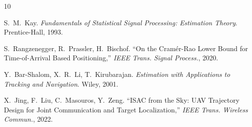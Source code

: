 \begin{thebibliography}{10}

S.~M.~Kay.
\textit{Fundamentals of Statistical Signal Processing: Estimation Theory}.
Prentice-Hall, 1993.

S.~Rangzenegger, R.~Prassler, H.~Bischof.
``On the Cram\'{e}r-Rao Lower Bound for Time-of-Arrival Based Positioning,''
\textit{IEEE Trans. Signal Process.}, 2020.

Y.~Bar-Shalom, X.~R.~Li, T.~Kirubarajan.
\textit{Estimation with Applications to Tracking and Navigation}.
Wiley, 2001.

X.~Jing, F.~Liu, C.~Masouros, Y.~Zeng.
``ISAC from the Sky: UAV Trajectory Design for Joint Communication and Target Localization,''
\textit{IEEE Trans. Wireless Commun.}, 2022.

\end{thebibliography}
